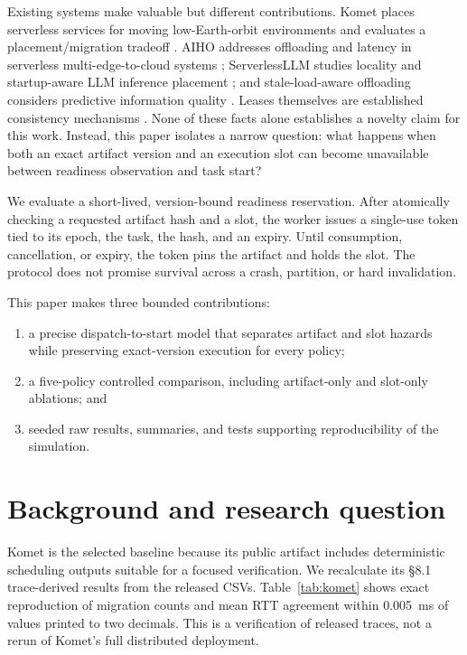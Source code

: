 \documentclass[11pt,a4paper]{article}
\begin{document}
Existing systems make valuable but different contributions. Komet places serverless services for moving low-Earth-orbit environments and evaluates a placement/migration tradeoff \cite{pfandzelter2024komet}. AIHO addresses offloading and latency in serverless multi-edge-to-cloud systems \cite{li2025aiho}; ServerlessLLM studies locality and startup-aware LLM inference placement \cite{fu2024serverlessllm}; and stale-load-aware offloading considers predictive information quality \cite{hamid2026staleness}. Leases themselves are established consistency mechanisms \cite{gray1989leases}. None of these facts alone establishes a novelty claim for this work. Instead, this paper isolates a narrow question: what happens when both an exact artifact version and an execution slot can become unavailable between readiness observation and task start?

We evaluate a short-lived, version-bound readiness reservation. After atomically checking a requested artifact hash and a slot, the worker issues a single-use token tied to its epoch, the task, the hash, and an expiry. Until consumption, cancellation, or expiry, the token pins the artifact and holds the slot. The protocol does not promise survival across a crash, partition, or hard invalidation.

This paper makes three bounded contributions:
\begin{enumerate}
\item a precise dispatch-to-start model that separates artifact and slot hazards while preserving exact-version execution for every policy;
\item a five-policy controlled comparison, including artifact-only and slot-only ablations; and
\item seeded raw results, summaries, and tests supporting reproducibility of the simulation.
\end{enumerate}

\section{Background and research question}

Komet is the selected baseline because its public artifact includes deterministic scheduling outputs suitable for a focused verification. We recalculate its \S8.1 trace-derived results from the released CSVs. Table~\ref{tab:komet} shows exact reproduction of migration counts and mean RTT agreement within 0.005~ms of values printed to two decimals. This is a verification of released traces, not a rerun of Komet's full distributed deployment.
\end{document}
